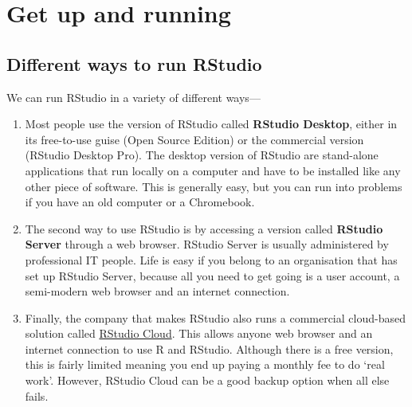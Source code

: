 \documentclass[
]{book}
\providecommand{\tightlist}{%
  \setlength{\itemsep}{0pt}\setlength{\parskip}{0pt}}
\begin{document}
\hypertarget{get-up-and-running}{%
\chapter*{Get up and running}\label{get-up-and-running}}

\hypertarget{different-ways-to-run-rstudio}{%
\section*{Different ways to run RStudio}\label{different-ways-to-run-rstudio}}

We can run RStudio in a variety of different ways---

\begin{enumerate}
\def\labelenumi{\arabic{enumi}.}
\tightlist
\item
  Most people use the version of RStudio called \textbf{RStudio Desktop}, either in its free-to-use guise (Open Source Edition) or the commercial version (RStudio Desktop Pro). The desktop version of RStudio are stand-alone applications that run locally on a computer and have to be installed like any other piece of software. This is generally easy, but you can run into problems if you have an old computer or a Chromebook.
\item
  The second way to use RStudio is by accessing a version called \textbf{RStudio Server} through a web browser. RStudio Server is usually administered by professional IT people. Life is easy if you belong to an organisation that has set up RStudio Server, because all you need to get going is a user account, a semi-modern web browser and an internet connection.
\item
  Finally, the company that makes RStudio also runs a commercial cloud-based solution called \href{https://rstudio.com/products/cloud/}{RStudio Cloud}. This allows anyone web browser and an internet connection to use R and RStudio. Although there is a free version, this is fairly limited meaning you end up paying a monthly fee to do `real work'. However, RStudio Cloud can be a good backup option when all else fails.
\end{enumerate}
\end{document}
